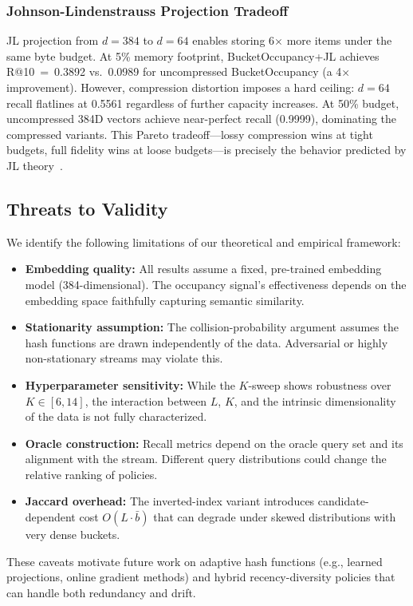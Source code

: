 \documentclass[conference]{IEEEtran}
\begin{document}
\subsubsection{Johnson-Lindenstrauss Projection Tradeoff}
JL projection from $d{=}384$ to $d{=}64$ enables storing 6$\times$ more
items under the same byte budget. At 5\% memory footprint,
BucketOccupancy+JL achieves R@10~=~0.3892 vs.\ 0.0989 for
uncompressed BucketOccupancy (a 4$\times$ improvement). However,
compression distortion imposes a hard ceiling: $d{=}64$ recall flatlines at
0.5561 regardless of further capacity increases. At 50\% budget,
uncompressed 384D vectors achieve near-perfect recall (0.9999),
dominating the compressed variants. This Pareto tradeoff---lossy
compression wins at tight budgets, full fidelity wins at loose
budgets---is precisely the behavior predicted by JL theory~\cite{b16}.

\subsection{Threats to Validity}
\label{sec:threats}
We identify the following limitations of our theoretical and empirical
framework:
\begin{itemize}
\item \textbf{Embedding quality:} All results assume a fixed,
      pre-trained embedding model (384-dimensional). The occupancy
      signal's effectiveness depends on the embedding space faithfully
      capturing semantic similarity.
\item \textbf{Stationarity assumption:} The collision-probability
      argument assumes the hash functions are drawn independently of the
      data. Adversarial or highly non-stationary streams may violate
      this.
\item \textbf{Hyperparameter sensitivity:} While the $K$-sweep shows
      robustness over $K \in [6,14]$, the interaction between $L$, $K$,
      and the intrinsic dimensionality of the data is not fully
      characterized.
\item \textbf{Oracle construction:} Recall metrics depend on the oracle
      query set and its alignment with the stream. Different query
      distributions could change the relative ranking of policies.
\item \textbf{Jaccard overhead:} The inverted-index variant introduces
      candidate-dependent cost $O(L \cdot \bar{b})$ that can degrade
      under skewed distributions with very dense buckets.
\end{itemize}
These caveats motivate future work on adaptive hash functions (e.g.,
learned projections, online gradient methods) and hybrid
recency-diversity policies that can handle both redundancy and drift.
\end{document}
